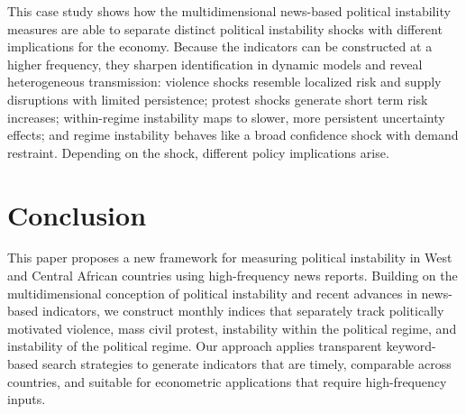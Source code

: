 \documentclass[12pt,a4paper,fleqn]{article}
\begin{document}
This case study shows how the multidimensional news-based political instability measures are able to separate distinct political instability shocks with different implications for the economy. Because the indicators can be constructed at a higher frequency, they sharpen identification in dynamic models and reveal heterogeneous transmission: violence shocks resemble localized risk and supply disruptions with limited persistence; protest shocks generate short term risk increases; within-regime instability maps to slower, more persistent uncertainty effects; and regime instability behaves like a broad confidence shock with demand restraint. Depending on the shock, different policy implications arise.










\section{Conclusion}\label{sec:conclusion}

This paper proposes a new framework for measuring political instability in West and Central African countries using high-frequency news reports. Building on the multidimensional conception of political instability and recent advances in news-based indicators, we construct monthly indices that separately track politically motivated violence, mass civil protest, instability within the political regime, and instability of the political regime. Our approach applies transparent keyword-based search strategies to generate indicators that are timely, comparable across countries, and suitable for econometric applications that require high-frequency inputs.
\end{document}
